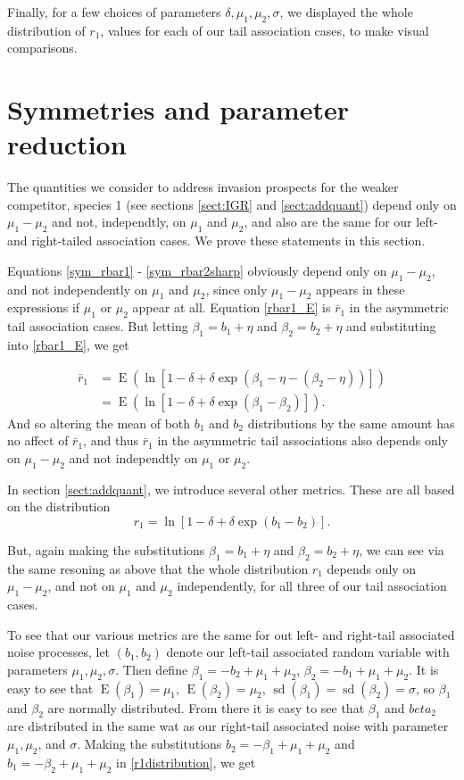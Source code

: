 \documentclass[letterpaper,11pt]{article}
\DeclareMathOperator{\EX}{E}%
\DeclareMathOperator{\sd}{sd}
\begin{document}
Finally, for a few choices of parameters $\delta, \mu_1, \mu_2, \sigma$, we displayed the whole distribution of $r_1$, values for each of our tail association cases, to make visual comparisons. 

\section{Symmetries and parameter reduction}

The quantities we consider to address invasion prospects for the weaker competitor, species 1 (see sections \ref{sect:IGR} and \ref{sect:addquant}) depend only on $\mu_1-\mu_2$ and not, independtly, on $\mu_1$ and $\mu_2$, and also are the same for our left- and right-tailed association cases. We prove these statements in this section.

Equations \ref{sym_rbar1} - \ref{sym_rbar2sharp} obviously depend only on $\mu_1-\mu_2$, and not independently on $\mu_1$ and $\mu_2$, since only $\mu_1-\mu_2$ appears in these expressions if $\mu_1$ or $\mu_2$ appear at all. 
Equation \ref{rbar1_E} is $\bar r_1$ in the asymmetric tail association cases.
But letting $\beta_1 = b_1 + \eta$ and $\beta_2 = b_2 + \eta$ and substituting into \ref{rbar1_E}, we get 

\begin{align}
\bar r_1 &= \EX(\ln[1-\delta+\delta \exp(\beta_1-\eta-(\beta_2-\eta))])\\
&= \EX(\ln[1-\delta+\delta \exp(\beta_1-\beta_2)]).
\end{align}
\noindent And so altering the mean of both $b_1$ and $b_2$ distributions by the same amount has no affect of $\bar r_1$, and thus $\bar r_1$ in the asymmetric tail associations also depends only on $\mu_1 - \mu_2$ and not independtly on $\mu_1$ or $\mu_2$.

In section \ref{sect:addquant}, we introduce several other metrics. These are all based on the distribution 
\begin{equation}
r_1=\ln[1-\delta+\delta \exp(b_1-b_2)]. \label{r1distribution}
\end{equation}

\noindent But, again making the substitutions $\beta_1 = b_1 + \eta$ and $\beta_2 = b_2 + \eta$, we can see via the same resoning as above that the whole distribution $r_1$ depends only on $\mu_1 - \mu_2$, and not on $\mu_1$ and $\mu_2$ independently, for all three of our tail association cases.

To see that our various metrics are the same for out left- and right-tail associated noise processes, let $(b_1,b_2)$ denote our left-tail associated random variable with parameters $\mu_1,\mu_2,\sigma$. 
Then define $\beta_1 = -b_2 + \mu_1 +\mu_2$, $\beta_2=-b_1+\mu_1+\mu_2$. 
It is easy to see that $\EX(\beta_1)=\mu_1$, $\EX(\beta_2)=\mu_2$, $\sd(\beta_1)=\sd(\beta_2)=\sigma$, so $\beta_1$ and $\beta_2$ are normally distributed.
From there it is easy to see that $\beta_1$ and $beta_2$ are distributed in the same wat as our right-tail associated noise with parameter $\mu_1,\mu_2$, and $\sigma$. 
Making the substitutions $b_2 = -\beta_1 + \mu_1 + \mu_2$ and $b_1 = -\beta_2 + \mu_1+\mu_2$ in \ref{r1distribution}, we get
\end{document}
